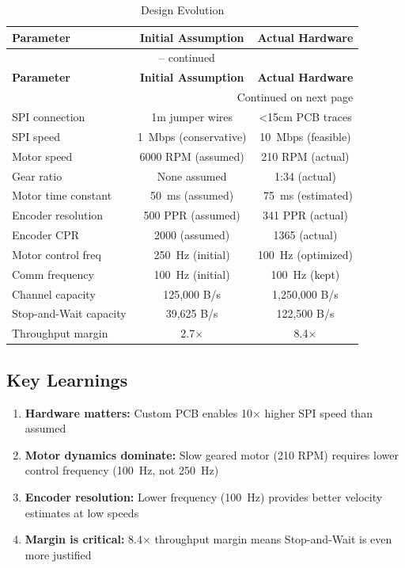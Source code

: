 \begin{longtable}{lcc}
\caption{Design Evolution} \\
\toprule
\textbf{Parameter} & \textbf{Initial Assumption} & \textbf{Actual Hardware} \\
\midrule
\endfirsthead
\multicolumn{3}{c}{{\tablename\ \thetable{} -- continued}} \\
\toprule
\textbf{Parameter} & \textbf{Initial Assumption} & \textbf{Actual Hardware} \\
\midrule
\endhead
\midrule
\multicolumn{3}{r}{{Continued on next page}} \\
\endfoot
\bottomrule
\endlastfoot
SPI connection & 1m jumper wires & <15cm PCB traces \\
SPI speed & 1~Mbps (conservative) & 10~Mbps (feasible) \\
Motor speed & 6000 RPM (assumed) & 210 RPM (actual) \\
Gear ratio & None assumed & 1:34 (actual) \\
Motor time constant & 50~ms (assumed) & ~75~ms (estimated) \\
Encoder resolution & 500 PPR (assumed) & 341 PPR (actual) \\
Encoder CPR & 2000 (assumed) & 1365 (actual) \\
Motor control freq & 250~Hz (initial) & 100~Hz (optimized) \\
Comm frequency & 100~Hz (initial) & 100~Hz (kept) \\
Channel capacity & 125,000 B/s & 1,250,000 B/s \\
Stop-and-Wait capacity & 39,625 B/s & 122,500 B/s \\
Throughput margin & 2.7× & 8.4× \\
\end{longtable}

\subsection{Key Learnings}

\begin{enumerate}
    \item \textbf{Hardware matters:} Custom PCB enables 10× higher SPI speed than assumed
    \item \textbf{Motor dynamics dominate:} Slow geared motor (210 RPM) requires lower control frequency (100~Hz, not 250~Hz)
    \item \textbf{Encoder resolution:} Lower frequency (100~Hz) provides better velocity estimates at low speeds
    \item \textbf{Margin is critical:} 8.4× throughput margin means Stop-and-Wait is even more justified
\end{enumerate}

